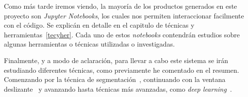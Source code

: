 Como más tarde iremos viendo, la mayoría de los productos generados en este proyecto son \textit{Jupyter Notebooks}, los cuales nos permiten interaccionar facilmente con el código. Se explicán en detalle en el capitulo de técnicas y herramientas~\ref{tecyher}. Cada uno de estos \textit{notebooks} contendrán estudios sobre algunas herramientas o técnicas utilizadas o investigadas.

Finalmente, y a modo de aclaración, para llevar a cabo este sistema se irán estudiando diferentes técnicas, como previamente he comentado en el resumen. Comenzando por la técnica de segmentación~\cite{wiki:segmentation}, continuando con la ventana deslizante~\cite{slidingwindow} y avanzando hasta técnicas más avanzadas, como \textit{deep learning}~\cite{deeplearning}.
